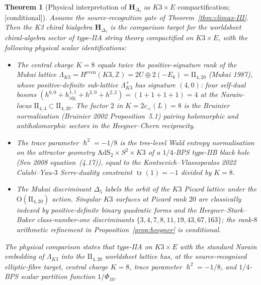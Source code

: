 \documentclass[11pt,reqno]{amsart}
\theoremstyle{plain}
\newtheorem{theorem}{Theorem}[section]
\theoremstyle{definition}
\theoremstyle{remark}
\providecommand{\ClaimStatusConditional}{\textnormal{[conditional]}}
\DeclareMathOperator{\tr}{tr}
\newcommand{\AdS}{\mathrm{AdS}}
\newcommand{\Zbb}{\mathbb{Z}}
\newcommand{\bfH}{\mathbf{H}}
\newcommand{\hbar}{{\hslash}}
\begin{document}
\begin{theorem}[Physical interpretation of $\bfH_{\Delta_5}$ as $K3 \times E$ compactification; \ClaimStatusConditional]
\label{thm:hdelta5-physics}
Assume the source-recognition gate of Theorem~\ref{thm:climax-III}. Then the K3 chiral bialgebra $\bfH_{\Delta_5}$ is the comparison target for the worldsheet chiral-algebra sector of type-IIA string theory compactified on $K3 \times E$, with the following physical scalar identifications:
\begin{itemize}
  \item The central charge $K = 8$ equals twice the positive-signature rank of the Mukai lattice $\Lambda_{K3} = H^{\mathrm{even}}(K3, \Zbb) = 2U \oplus 2(-E_8) = \mathrm{II}_{4, 20}$ (Mukai 1987), whose positive-definite sub-lattice $\Lambda^+_{K3}$ has signature $(4, 0)$: four self-dual bosons $(h^{0,0} + h^{1,1}_{\mathrm{alg}} + h^{2,0} + h^{2,2}) = (1 + 1 + 1 + 1) = 4$ at the Narain-locus $\mathrm{II}_{4, 4} \subset \mathrm{II}_{4, 20}$. The factor $2$ in $K = 2 c_+(L) = 8$ is the Bruinier normalisation (Bruinier 2002 Proposition~5.1) pairing holomorphic and antiholomorphic sectors in the Heegner--Chern reciprocity.
  \item The trace parameter $\hbar^2 = -1/8$ is the tree-level Wald entropy normalisation on the attractor geometry $\AdS_2 \times S^2 \times K3$ of a $1/4$-BPS type-IIB black hole (Sen 2008 equation~(4.17)), equal to the Kontsevich--Vlassopoulos 2022 Calabi--Yau-$3$ Serre-duality constraint $\tr(1) = -1$ divided by $K = 8$.
  \item The Mukai discriminant $\Delta_5$ labels the orbit of the $K3$ Picard lattice under the $\mathrm{O}(\mathrm{II}_{4, 20})$ action. Singular $K3$ surfaces at Picard rank $20$ are classically indexed by positive-definite binary quadratic forms and the Heegner--Stark--Baker class-number-one discriminants $\{3, 4, 7, 8, 11, 19, 43, 67, 163\}$; the rank-$8$ arithmetic refinement in Proposition~\ref{prop:heegner} is conditional.
\end{itemize}
The physical comparison states that type-IIA on $K3 \times E$ with the standard Narain embedding of $\Lambda_{K3}$ into the $\mathrm{II}_{4, 20}$ worldsheet lattice has, at the source-recognised elliptic-fibre target, central charge $K = 8$, trace parameter $\hbar^2 = -1/8$, and $1/4$-BPS scalar partition function $1/\Phi_{10}$.
\end{theorem}
\end{document}
